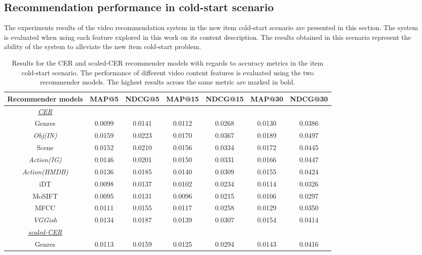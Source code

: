 \documentclass[review]{elsarticle}
\begin{document}
\subsection{Recommendation performance in cold-start scenario}\label{sec:recommendation_cold_start_scenario_experiment}
The experiments results of the video recommendation system in the new item cold-start scenario are presented in this section. The system is evaluated when using each feature explored in this work on its content description. The results obtained in this scenario represent the ability of the system to alleviate the new item cold-start problem. 



	\begin{table}[H]
\caption{Results for the CER and scaled-CER recommender models with regards to accuracy metrics in the item cold-start scenario. The performance of different video content features is evaluated using the two recommender models. The highest results across the same metric are marked in bold.}
  \label{tab:coldstart_map_ndcg}
  \centering
    \begin{adjustbox}{width=\columnwidth}
    \begin{tabular}{|c|c c c c c c|}
        \cline{1-7}
Recommender models		& MAP@5 	& NDCG@5 	& MAP@15 	& NDCG@15 	& MAP@30 	& NDCG@30 	\\
\midrule
\underline{\textit{CER}} & & & & & & \\
Genres 	&0.0099	&0.0141	&0.0112	&0.0268	&0.0130	&0.0386	\\ 
\textit{Obj(IN)}	&0.0159	&0.0223	&0.0170	&0.0367	&0.0189	&0.0497	\\
Scene 	&0.0152	&0.0210	&0.0156	&0.0334	&0.0172	&0.0445	\\ 
\textit{Action(IG)} 	&0.0146	&0.0201	&0.0150	&0.0331	&0.0166	&0.0447	\\ 
\textit{Action(HMDB)} 	&0.0136	&0.0185	&0.0140	&0.0309	&0.0155	&0.0424	\\ 
iDT 	&0.0098	&0.0137	&0.0102	&0.0234	&0.0114	&0.0326	\\ 
MoSIFT 	&0.0095	&0.0131	&0.0096	&0.0215	&0.0106	&0.0297	\\ 
MFCC 	&0.0111	&0.0155	&0.0117	&0.0258	&0.0129	&0.0350	\\ 
\textit{VGGish} 	&0.0134	&0.0187	&0.0139	&0.0307	&0.0154	&0.0414	\\ 
\midrule
\underline{\textit{scaled-CER}} & & & & & &\\
Genres 	&0.0113	&0.0159	&0.0125	&0.0294	&0.0143	&0.0416	\\ 

\end{tabular}
\end{adjustbox}
\end{table}
\end{document}
